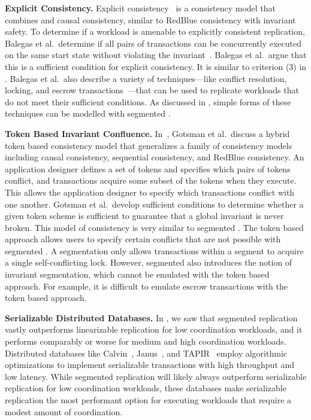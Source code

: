 \textbf{Explicit Consistency.}
Explicit consistency~\cite{balegas2015towards} is a consistency model that
combines \invariantconfluence{} and causal consistency, similar to RedBlue
consistency with invariant safety. To determine if a workload is amenable to
explicitly consistent replication, Balegas et al.\ determine if all pairs of
transactions can be concurrently executed on the same start state without
violating the invariant~\cite{balegas2015towards}. Balegas et al.\ argue that
this is a sufficient condition for explicit consistency. It is similar to
criterion (3) in . Balegas et al.\ also describe a
variety of techniques---like conflict resolution, locking, and escrow
transactions~\cite{o1986escrow}---that can be used to replicate workloads that
do not meet their sufficient conditions. As discussed in ,
simple forms of these techniques can be modelled with segmented
\invariantconfluence{}.

\textbf{Token Based Invariant Confluence.}
In~\cite{gotsman2016cause}, Gotsman et al.\ discuss a hybrid token based
consistency model that generalizes a family of consistency models including
causal consistency, sequential consistency, and RedBlue consistency. An
application designer defines a set of tokens and specifies which pairs of
tokens conflict, and transactions acquire some subset of the tokens when they
execute. This allows the application designer to specify which transactions
conflict with one another.  Gotsman et al.\ develop sufficient conditions to
determine whether a given token scheme is sufficient to guarantee that a global
invariant is never broken. This model of consistency is very similar to
segmented \invariantconfluence{}. The token based approach allows users to
specify certain conflicts that are not possible with segmented
\invariantconfluence{}. A segmentation only allows transactions within a
segment to acquire a single self-conflicting lock. However, segmented
\invariantconfluence{} also introduces the notion of invariant segmentation,
which cannot be emulated with the token based approach. For example, it is
difficult to emulate escrow transactions with the token based approach.

\textbf{Serializable Distributed Databases.}
In , we saw that segmented \invariantconfluent{} replication
vastly outperforms linearizable replication for low coordination workloads, and
it performs comparably or worse for medium and high coordination workloads.
Distributed databases like Calvin~\cite{thomson2012calvin},
Janus~\cite{mu2016consolidating}, and TAPIR~\cite{zhang2015building} employ
algorithmic optimizations to implement serializable transactions with high
throughput and low latency.
%
While segmented \invariantconfluent{} replication will likely always outperform
serializable replication for low coordination workloads, these databases make
serializable replication the most performant option for executing workloads
that require a modest amount of coordination.

